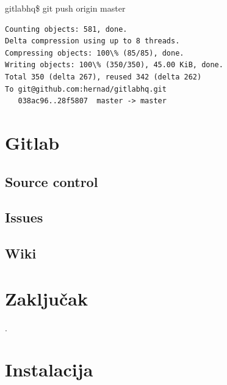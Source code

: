 \documentclass[times, utf8, seminar]{fit}
\begin{document}
gitlabhq\$ git push origin master

\begin{lstlisting}
Counting objects: 581, done.
Delta compression using up to 8 threads.
Compressing objects: 100\% (85/85), done.
Writing objects: 100\% (350/350), 45.00 KiB, done.
Total 350 (delta 267), reused 342 (delta 262)
To git@github.com:hernad/gitlabhq.git
   038ac96..28f5807  master -> master

\end{lstlisting}




\chapter {Gitlab}
\vspace*{-0.7cm}

\section{Source control}

\section{Issues}

\section{Wiki}

\chapter{Zaključak}

.




\appendix

\chapter{Instalacija}
\vspace*{-0.7cm}
\setlength{\parindent}{0cm}
\end{document}
